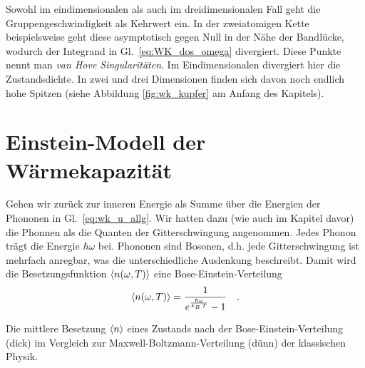 Sowohl im eindimensionalen als auch im dreidimensionalen Fall geht die Gruppengeschwindigkeit als Kehrwert ein. In der zweiatomigen Kette beispielsweise geht diese asymptotisch gegen Null in der Nähe der Bandlücke, wodurch der Integrand in Gl.~\ref{eq:WK_dos_omega} divergiert. Diese Punkte nennt man \emph{van Hove Singularitäten}. Im Eindimensionalen divergiert hier die Zustandsdichte. In zwei und drei Dimensionen finden sich davon noch endlich hohe Spitzen (siehe Abbildung \ref{fig:wk_kupfer} am Anfang des Kapitels).





\section{Einstein-Modell der Wärmekapazität}

Gehen wir zurück zur inneren Energie als Summe über die Energien der Phononen in Gl.~\ref{eq:wk_u_allg}. Wir hatten dazu (wie auch im Kapitel davor) die Phonnen als die Quanten der Gitterschwingung angenommen. Jedes Phonon trägt die Energie $\hbar \omega$ bei. Phononen sind Bosonen, d.h. jede Gitterschwingung ist mehrfach anregbar, was die unterschiedliche Auslenkung beschreibt. Damit wird die Besetzungsfunktion $\braket{n (\omega,T) }$ eine Bose-Einstein-Verteilung
\begin{equation}
\braket{n (\omega,T) } = \frac{1}{e^{\frac{\hbar \omega}{k_B \, T} }- 1} \quad .
\end{equation}

\begin{marginfigure}

\caption{Die mittlere Besetzung $\braket{n}$ eines Zustands nach der Bose-Einstein-Verteilung (dick) im Vergleich zur Maxwell-Boltzmann-Verteilung (dünn) der klassischen Physik.}
\end{marginfigure}


